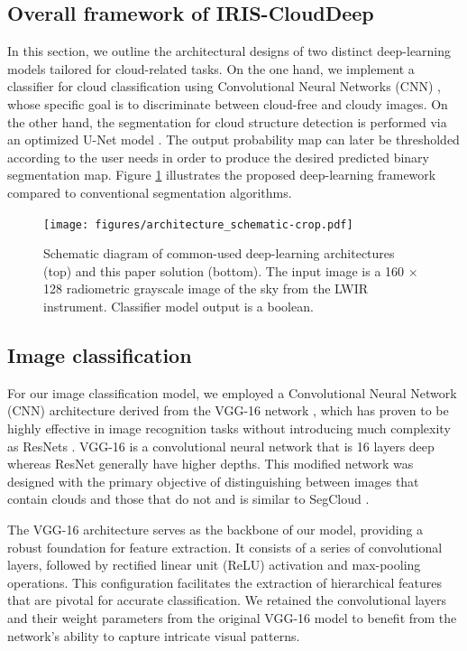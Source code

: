 \documentclass[amt, article]{copernicus}
\begin{document}
\subsection{Overall framework of IRIS-CloudDeep}

In this section, we outline the architectural designs of two distinct deep-learning models tailored for cloud-related tasks. On the one hand, we implement a classifier for cloud classification using Convolutional Neural Networks (CNN) \citep{lecun1995convolutional, Krizhevsky2012}, whose specific goal is to discriminate between cloud-free and cloudy images. On the other hand, the segmentation for cloud structure detection is performed via an optimized U-Net model \citep{UNET}. The output probability map can later be thresholded according to the user needs in order to produce the desired predicted binary segmentation map. Figure \ref{fig:architecture_schematic} illustrates the proposed deep-learning framework compared to conventional segmentation algorithms.

\begin{figure}[t]
	\texttt{[image: figures/architecture\_schematic-crop.pdf]}
	\caption{Schematic diagram of common-used deep-learning architectures (top) and this paper solution (bottom). The input image is a 160 × 128 radiometric grayscale image of the sky from the LWIR instrument. Classifier model output is a boolean.}
    \label{fig:architecture_schematic}
\end{figure}


\subsection{Image classification}

For our image classification model, we employed a Convolutional Neural Network (CNN) architecture \citep{SHARMA2018377} derived from the VGG-16 network \citep{simonyan2015deep}, which has proven to be highly effective in image recognition tasks \citep{canziani2016analysis} without introducing much complexity as ResNets \citep{ResNet}. VGG-16 is a convolutional neural network that is 16 layers deep whereas ResNet generally have higher depths. This modified network was designed with the primary objective of distinguishing between images that contain clouds and those that do not and is similar to SegCloud \citep{SegCloud}.

The VGG-16 architecture serves as the backbone of our model, providing a robust foundation for feature extraction. It consists of a series of convolutional layers, followed by rectified linear unit (ReLU) activation \citep{agarap2018deep} and max-pooling operations. This configuration facilitates the  extraction of hierarchical features that are pivotal for accurate classification. We retained the convolutional layers and their weight parameters from the original VGG-16 model to benefit from the network's ability to capture intricate visual patterns.
\end{document}

